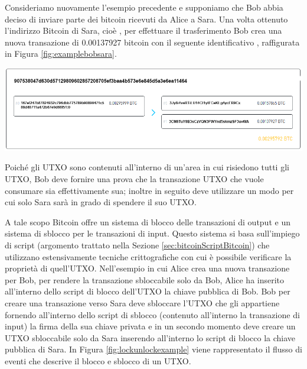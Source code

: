 \begin{example}
Consideriamo nuovamente l'esempio precedente e supponiamo che Bob abbia deciso di inviare parte dei bitcoin ricevuti da Alice a Sara. Una volta ottenuto l’indirizzo Bitcoin di Sara, cioè , per effettuare il trasferimento Bob  crea una nuova transazione di 0.00137927 bitcoin con il seguente identificativo , raffigurata in Figura \ref{fig:examplebobsara}.

{\centering
\vspace{15pt}
\includegraphics[scale=0.35]{images/example_bob_sara.png}
\vspace{10pt}
\par}


Poiché gli UTXO sono contenuti all’interno di un'area in cui risiedono tutti gli UTXO, Bob deve fornire una prova che la transazione UTXO che vuole consumare sia effettivamente sua; inoltre in seguito deve utilizzare un modo per cui solo Sara  sarà in grado di spendere il suo UTXO.

A tale scopo Bitcoin offre un sistema di blocco delle transazioni di output e un sistema di sblocco per le transazioni di input.  Questo sistema si basa sull'impiego di script (argomento trattato nella Sezione \ref{sec:bitcoinScriptBitcoin}) che utilizzano estensivamente tecniche crittografiche con cui è possibile verificare la proprietà di quell'UTXO.
Nell'esempio in cui Alice crea una nuova transazione per Bob, per rendere la transazione sbloccabile solo da Bob, Alice ha inserito all’interno dello script di blocco dell’UTXO la chiave pubblica di Bob.\newline
Bob per creare una transazione verso Sara deve sbloccare l’UTXO che gli appartiene fornendo all’interno dello script di sblocco (contenuto all’interno la transazione di input) la firma della sua chiave privata e in un secondo momento deve creare un UTXO sbloccabile solo da Sara inserendo all’interno lo script di blocco la chiave pubblica di Sara.\newline
In Figura \ref{fig:lockunlockexample} viene rappresentato il flusso di eventi che descrive il blocco e sblocco di un UTXO.


\end{example}

